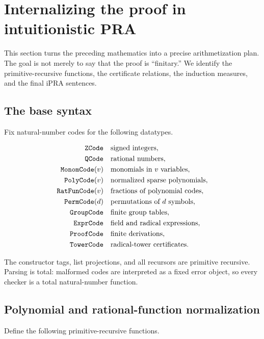 \section{Internalizing the proof in intuitionistic PRA}
\label{sec:internalization}

This section turns the preceding mathematics into a precise arithmetization
plan.  The goal is not merely to say that the proof is ``finitary.''  We
identify the primitive-recursive functions, the certificate relations, the
induction measures, and the final iPRA sentences.

\subsection{The base syntax}

Fix natural-number codes for the following datatypes.

\begin{align*}
 \code{ZCode} & &&\text{signed integers},\\
 \code{QCode} & &&\text{rational numbers},\\
 \code{MonomCode}(v) & &&\text{monomials in $v$ variables},\\
 \code{PolyCode}(v) & &&\text{normalized sparse polynomials},\\
 \code{RatFunCode}(v) & &&\text{fractions of polynomial codes},\\
 \code{PermCode}(d) & &&\text{permutations of $d$ symbols},\\
 \code{GroupCode} & &&\text{finite group tables},\\
 \code{ExprCode} & &&\text{field and radical expressions},\\
 \code{ProofCode} & &&\text{finite derivations},\\
 \code{TowerCode} & &&\text{radical-tower certificates}.
\end{align*}

The constructor tags, list projections, and all recursors are primitive
recursive.  Parsing is total: malformed codes are interpreted as a fixed
error object, so every checker is a total natural-number function.

\subsection{Polynomial and rational-function normalization}

Define the following primitive-recursive functions.

